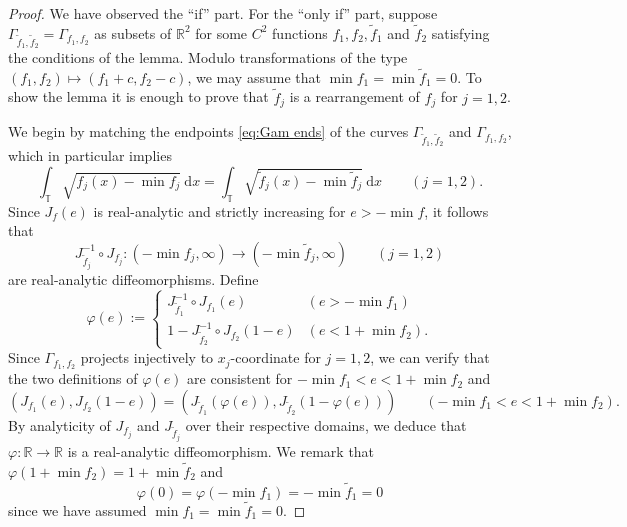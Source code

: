 \documentclass[10pt,a4paper]{amsart}
\newcommand{\R}{\mathbb{R}}
\newcommand{\T}{\mathbb{T}}
\newcommand{\dif}{\mathrm{d}}
\newcommand{\inv}{^{-1}}
\newcommand{\wt}{\widetilde}
\begin{document}
\begin{proof}
	We have observed the ``if'' part. 
	For the ``only if'' part, suppose $\Gamma_{\wt f_1, \wt f_2} = \Gamma_{f_1, f_2}$ as subsets of $\R^2$ for some $C^2$ functions $f_1, f_2, \wt f_1$ and $\wt f_2$ satisfying the conditions of the lemma.
	Modulo transformations of the type $(f_1, f_2) \mapsto (f_1 + c, f_2 - c)$, we may assume that $\min f_1 = \min \wt f_1 = 0$.
	To show the lemma it is enough to prove that $\wt f_j$ is a rearrangement of $f_j$ for $j = 1,2$.

\medskip

    We begin by matching the endpoints \eqref{eq:Gam ends} of the curves $\Gamma_{\wt f_1, \wt f_2}$ and $\Gamma_{f_1, f_2}$, which in particular implies
    \begin{equation*}        \int_{\T} \sqrt{f_j(x) - \min f_j}\ \dif x = 
        \int_{\T} \sqrt{\wt f_j(x) - \min \wt f_j}\ \dif x \qquad (j = 1,2).
    \end{equation*}
	Since $J_f(e)$ is real-analytic and strictly increasing for $e > -\min f$, it follows that 
    \begin{equation*}        J_{\wt f_j}\inv \circ J_{f_j} : (-\min f_j, \infty) \to  (-\min \wt f_j, \infty) \qquad (j = 1,2)
    \end{equation*}
    are real-analytic diffeomorphisms.
    Define 
    \begin{equation*}    \varphi(e) :=  \begin{cases}
            J_{\wt f_1}\inv \circ J_{f_1} (e) & (e > -\min f_1) \\
            1 - J_{\wt f_2}\inv \circ J_{f_2} (1 - e)  & (e < 1 + \min f_2).
        \end{cases}
    \end{equation*}
    Since $\Gamma_{f_1, f_2}$ projects injectively to $x_j$-coordinate for $j = 1,2$, we can verify that the two definitions of $\varphi(e)$ are consistent for $-\min f_1 < e < 1 + \min f_2$ and
    \begin{equation}\label{eq:J reparam}
        (J_{f_1}(e), J_{f_2}(1- e)) = (J_{\wt f_1}(\varphi(e)), J_{\wt f_2}(1- \varphi(e))) \qquad  (-\min f_1 < e < 1 + \min f_2).
    \end{equation}
    By analyticity of $J_{f_j}$ and $J_{\wt f_j}$ over their respective domains, we deduce that $\varphi: \R \to \R$ is a real-analytic diffeomorphism.
    We remark that $\varphi(1 + \min f_2) = 1 + \min \wt f_2$ and 
    \begin{equation*}    
        \varphi(0) = \varphi(-\min f_1) = - \min \wt f_1 = 0
    \end{equation*} 
 since we have assumed $\min f_1 = \min \wt f_1 = 0$.


\end{proof}
\end{document}
